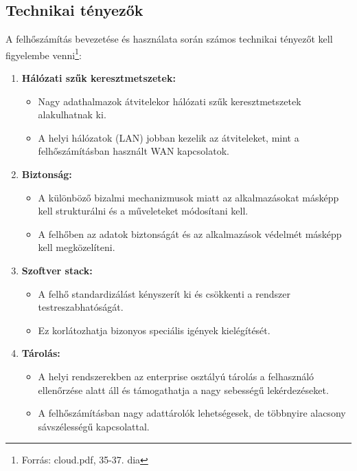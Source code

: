 \documentclass[a4paper,12pt]{article}
\begin{document}
    \subsection{Technikai tényezők}

    A felhőszámítás bevezetése és használata során számos technikai tényezőt kell figyelembe venni\footnote{Forrás: cloud.pdf, 35-37. dia}:

    \begin{enumerate}
        \item \textbf{Hálózati szűk keresztmetszetek:}
        \begin{itemize}
            \item Nagy adathalmazok átvitelekor hálózati szűk keresztmetszetek alakulhatnak ki.
            \item A helyi hálózatok (LAN) jobban kezelik az átviteleket, mint a felhőszámításban használt WAN kapcsolatok.
        \end{itemize}

        \item \textbf{Biztonság:}
        \begin{itemize}
            \item A különböző bizalmi mechanizmusok miatt az alkalmazásokat másképp kell strukturálni és a műveleteket módosítani kell.
            \item A felhőben az adatok biztonságát és az alkalmazások védelmét másképp kell megközelíteni.
        \end{itemize}

        \item \textbf{Szoftver stack:}
        \begin{itemize}
            \item A felhő standardizálást kényszerít ki és csökkenti a rendszer testreszabhatóságát.
            \item Ez korlátozhatja bizonyos speciális igények kielégítését.
        \end{itemize}

        \item \textbf{Tárolás:}
        \begin{itemize}
            \item A helyi rendszerekben az enterprise osztályú tárolás a felhasználó ellenőrzése alatt áll és támogathatja a nagy sebességű lekérdezéseket.
            \item A felhőszámításban nagy adattárolók lehetségesek, de többnyire alacsony sávszélességű kapcsolattal.
        \end{itemize}
    \end{enumerate}
\end{document}
